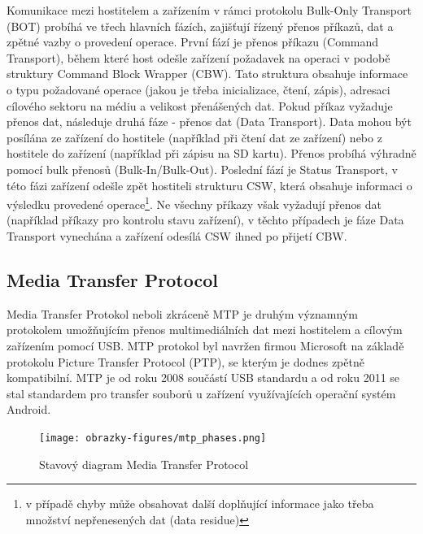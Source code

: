 Komunikace mezi hostitelem a zařízením v rámci protokolu Bulk-Only Transport (BOT) probíhá ve třech hlavních fázích, zajišťují řízený přenos příkazů, dat a zpětné vazby o provedení operace. První fází je přenos příkazu (Command Transport), během které host odešle zařízení požadavek na operaci v podobě struktury Command Block Wrapper (CBW). Tato struktura obsahuje informace o typu požadované operace (jakou je třeba inicializace, čtení, zápis), adresaci cílového sektoru na médiu a velikost přenášených dat. Pokud příkaz vyžaduje přenos dat, následuje druhá fáze - přenos dat (Data Transport). Data mohou být posílána ze zařízení do hostitele (například při čtení dat ze zařízení) nebo z hostitele do zařízení (například při zápisu na SD kartu). Přenos probíhá výhradně pomocí bulk přenosů (Bulk-In/Bulk-Out). Poslední fází je Status Transport, v této fázi zařízení odešle zpět hostiteli strukturu CSW, která obsahuje informaci o výsledku provedené operace\footnote{v případě chyby může obsahovat další doplňující informace jako třeba množství nepřenesených dat (data residue)}. Ne všechny příkazy však vyžadují přenos dat (například příkazy pro kontrolu stavu zařízení), v těchto případech je fáze Data Transport vynechána a zařízení odesílá CSW ihned po přijetí CBW. \cite{silicon_labs_mass_storage_protocol}



\subsection{Media Transfer Protocol}
Media Transfer Protokol neboli zkráceně MTP je druhým významným protokolem umožňujícím přenos multimediálních dat mezi hostitelem a cílovým zařízením pomocí USB. MTP protokol byl navržen firmou Microsoft na základě protokolu Picture Transfer Protocol (PTP), se kterým je dodnes zpětně kompatibilní. MTP je od roku 2008 součástí USB standardu a od roku 2011 se stal standardem pro transfer souborů u zařízení využívajících operační systém Android. 

\begin{figure}[h]
    \centering
    \texttt{[image: obrazky-figures/mtp\_phases.png]}
    
    \caption{Stavový diagram Media Transfer Protocol \cite{silicon_labs_mass_storage_protocol}}
    \label{fig:mtp-protocol}
\end{figure}

